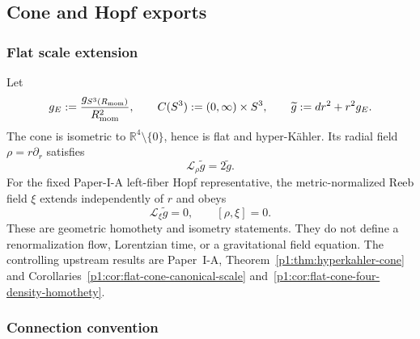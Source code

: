 \documentclass[12pt,a4paper]{article}
\begin{document}
\subsection{Cone and Hopf exports}
\label{p2:sec:geoCon}

\subsubsection{Flat scale extension}

Let
\[
 g_E:=\frac{g_{S^3(R_{\mathrm{mom}})}}{R_{\mathrm{mom}}^2},
 \qquad
 C(S^3):=(0,\infty)\times S^3,
 \qquad
 \widetilde g:=dr^2+r^2g_E.
\]
The cone is isometric to \(\mathbb R^4\setminus\{0\}\), hence is flat and
hyper-K\"ahler.  Its radial field \(\rho=r\partial_r\) satisfies
\[
        \mathcal L_\rho\widetilde g=2\widetilde g.
\]
For the fixed Paper-I-A left-fiber Hopf representative, the
metric-normalized Reeb field \(\xi\) extends independently of \(r\) and obeys
\[
        \mathcal L_\xi\widetilde g=0,
        \qquad
        [\rho,\xi]=0.
\]
These are geometric homothety and isometry statements.  They do not define a
renormalization flow, Lorentzian time, or a gravitational field equation.
The controlling upstream results are Paper~I-A,
Theorem~\ref{p1:thm:hyperkahler-cone} and
Corollaries~\ref{p1:cor:flat-cone-canonical-scale}
and~\ref{p1:cor:flat-cone-four-density-homothety}.

\subsubsection{Connection convention}
\end{document}
